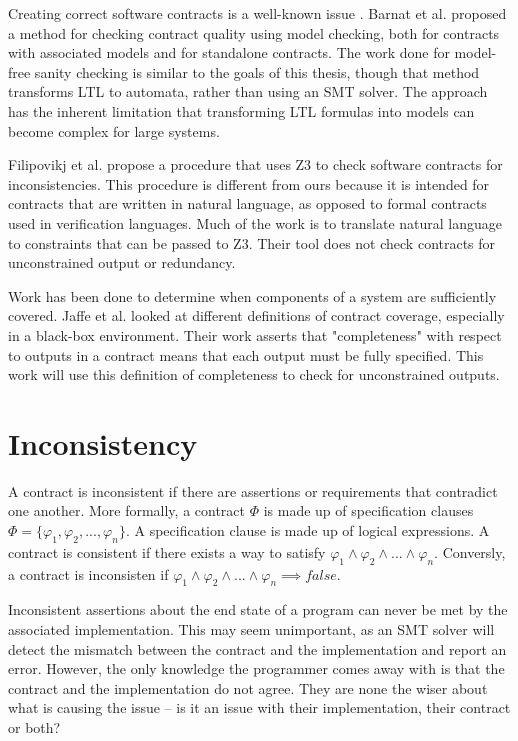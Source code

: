 \documentclass{article}
\begin{document}
Creating correct software contracts is a well-known issue \cite{rozier2016specification} \cite{kupferman2006sanity}.
Barnat et al. \cite{barnat2012checking} \cite{barnat2016analysing} proposed a method for checking contract quality using model checking,
both for contracts with associated models and for standalone contracts. The work done for model-free sanity checking is
similar to the goals of this thesis, though that method transforms LTL to automata, rather than using an SMT solver. The approach
has the inherent limitation that transforming LTL formulas into models can become complex for large systems.

Filipovikj et al. \cite{filipovikj2017smt} propose a procedure that uses Z3 \cite{de2008z3} to check software contracts
for inconsistencies. This procedure is different from ours because it is intended for contracts that are written in
natural language, as opposed to formal contracts used in verification languages. Much of the work is to translate
natural language to constraints that can be passed to Z3. Their tool does not check contracts
for unconstrained output or redundancy.

Work has been done to determine when components of a system are sufficiently covered. Jaffe et al. \cite{jaffe1989completeness}
looked at different definitions of contract coverage, especially in a black-box environment. Their work asserts that "completeness"
with respect to outputs in a contract means that each output must be fully specified. This work will use this definition of
completeness to check for unconstrained outputs.

\section{Inconsistency}

A contract is inconsistent if there are assertions or requirements that contradict one another. More formally, a
contract \(\Phi\) is made up of specification clauses \(\Phi = \{\varphi_{1}, \varphi_{2}, ..., \varphi_{n}\}\).
A specification clause is made up of logical expressions. A contract is consistent if there exists a way to satisfy
\(\varphi_{1} \land \varphi_{2} \land ... \land \varphi_{n} \). Conversly, a contract is inconsisten
if \(\varphi_{1} \land \varphi_{2} \land ... \land \varphi_{n} \implies false\).

Inconsistent assertions about the end state of a program can never be met by the associated implementation.
This may seem unimportant, as an SMT solver will detect the mismatch between the contract and the implementation
and report an error. However, the only knowledge the programmer comes away with is that the contract and the
implementation do not agree. They are none the wiser about what is causing the issue – is it an issue
with their implementation, their contract or both?
\end{document}
